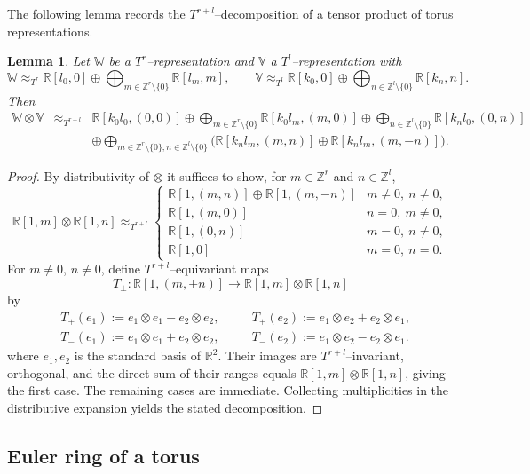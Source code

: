 \documentclass[reqno,twoside,12pt]{amsart}
\newtheorem{Lemma}[Remark]{Lemma}
\newcommand{\bR}{\mathbb{R}}
\newcommand{\bV}{\mathbb{V}}
\newcommand{\bW}{\mathbb{W}}
\newcommand{\bZ}{\mathbb{Z}}
\numberwithin{equation}{section} \errorcontextlines=0
\begin{document}
The following lemma records the $T^{r+l}$–decomposition of a tensor product of torus representations.

\begin{Lemma}\label{lem:T-product-decomp}
Let $\bW$ be a $T^{r}$–representation and $\bV$ a $T^{l}$–representation with
\[
\bW\approx_{T^r} \bR[l_{0},0]\oplus \bigoplus_{m\in\bZ^{r}\setminus\{0\}} \bR[l_{m},m],
\qquad
\bV\approx_{T^l} \bR[k_{0},0]\oplus \bigoplus_{n\in\bZ^{l}\setminus\{0\}} \bR[k_{n},n].
\]
Then
\begin{eqnarray*}
\bW\otimes\bV &\approx_{T^{r+l}}&\bR[k_{0}l_{0},(0,0)]
\oplus \bigoplus_{m\in\bZ^{r}\setminus\{0\}}\bR[k_{0}l_{m},(m,0)]
\oplus \bigoplus_{n\in\bZ^{l}\setminus\{0\}}\bR[k_{n}l_{0},(0,n)]
\\
&&\oplus \bigoplus_{m\in\bZ^{r}\setminus\{0\},  n\in\bZ^{l}\setminus\{0\}}
\bigl(\bR[k_{n}l_{m},(m,n)]\oplus \bR[k_{n}l_{m},(m,-n)]\bigr).
\end{eqnarray*}
\end{Lemma}

\begin{proof}
By distributivity of $\otimes$ it suffices to show, for $m\in\bZ^{r}$ and $n\in\bZ^{l}$,
\[
\bR[1,m]\otimes \bR[1,n]\approx_{T^{r+l}} \begin{cases}
\bR[1,(m,n)]\oplus \bR[1,(m,-n)] & m\ne 0,\ n\ne 0,\\
\bR[1,(m,0)]                     & n=0,\ m\ne 0,\\
\bR[1,(0,n)]                     & m=0,\ n\ne 0,\\
\bR[1,0]                         & m=0,\ n=0.
\end{cases}
\]
For $m\ne0$, $n\ne0$, define $T^{r+l}$–equivariant maps
$$
T_\pm: \bR[1,(m,\pm n)]\longrightarrow \bR[1,m]\otimes \bR[1,n]
$$
by
\[
\begin{aligned}
&T_+(e_1):=e_1\otimes e_1-e_2\otimes e_2,\quad &&T_+(e_2):=e_1\otimes e_2+e_2\otimes e_1,\\
&T_-(e_1):=e_1\otimes e_1+e_2\otimes e_2,\quad &&T_-(e_2):=e_1\otimes e_2-e_2\otimes e_1.
\end{aligned}
\]
where $e_1,e_2$ is the standard basis of $\bR^2$. Their images are $T^{r+l}$–invariant, orthogonal, and
the direct sum of their ranges equals $\bR[1,m]\otimes \bR[1,n]$,
giving the first case. The remaining cases are immediate. Collecting multiplicities in the distributive expansion yields the stated decomposition.
\end{proof}

\subsection{Euler ring of a torus}\label{subsec:Eringtorus}
\end{document}

